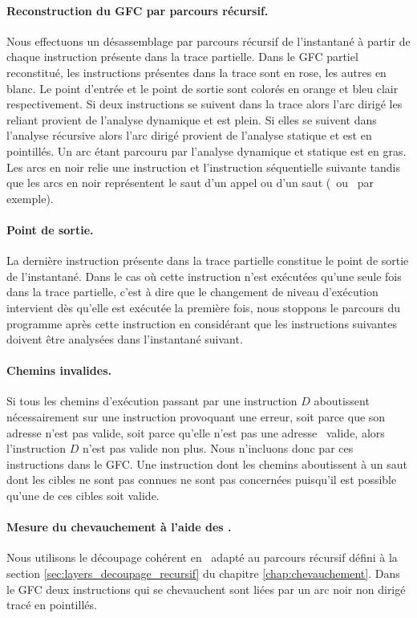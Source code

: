 \paragraph{Reconstruction du GFC par parcours récursif.}
Nous effectuons un désassemblage par parcours récursif de l'instantané à partir de chaque instruction présente dans la trace partielle.
Dans le GFC partiel reconstitué, les instructions présentes dans la trace sont en rose, les autres en blanc. Le point d'entrée et le point de sortie sont colorés en orange et bleu clair respectivement.
Si deux instructions se suivent dans la trace alors l'arc dirigé les reliant provient de l'analyse dynamique et est plein. Si elles se suivent dans l'analyse récursive alors l'arc dirigé provient de l'analyse statique et est en pointillés. Un arc étant parcouru par l'analyse dynamique et statique est en gras. Les arcs en noir relie une instruction et l'instruction séquentielle suivante tandis que les arcs en noir représentent le saut d'un appel ou d'un saut (\call\ ou \jmp\ par exemple).

\paragraph{Point de sortie.}
La dernière instruction présente dans la trace partielle constitue le point de sortie de l'instantané.
Dans le cas où cette instruction n'est exécutées qu'une seule fois dans la trace partielle, c'est à dire que le changement de niveau d'exécution intervient dès qu'elle est exécutée la première fois, nous stoppons le parcours du programme après cette instruction en considérant que les instructions suivantes doivent être analysées dans l'instantané suivant.

\paragraph{Chemins invalides.}
Si tous les chemins d'exécution passant par une instruction $D$ aboutissent nécessairement sur une instruction provoquant une erreur, soit parce que son adresse n'est pas valide, soit parce qu'elle n'est pas une adresse \xq\ valide, alors l'instruction $D$ n'est pas valide non plus.
Nous n'incluons donc par ces instructions dans le GFC.
Une instruction dont les chemins aboutissent à un saut dont les cibles ne sont pas connues ne sont pas concernées puisqu'il est possible qu'une de ces cibles soit valide.


\paragraph{Mesure du chevauchement à l'aide des \layers.}
Nous utilisons le découpage cohérent en \layers\ adapté au parcours récursif défini à la section \ref{sec:layers_decoupage_recursif} du chapitre \ref{chap:chevauchement}.
Dans le GFC deux instructions qui se chevauchent sont liées par un arc noir non dirigé tracé en pointillés.


